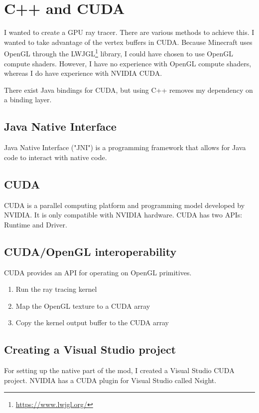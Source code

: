 \documentclass[]{article}
\begin{document}
\section{C++ and CUDA}
I wanted to create a GPU ray tracer.
There are various methods to achieve this. 
I wanted to take advantage of the vertex buffers in CUDA.
Because Minecraft uses OpenGL through the LWJGL\footnote{\url{https://www.lwjgl.org/}} library, I could have chosen to use OpenGL compute shaders.
However, I have no experience with OpenGL compute shaders, whereas I do have experience with NVIDIA CUDA.

There exist Java bindings for CUDA, but using C++ removes my dependency on a binding layer.
\subsection{Java Native Interface}
Java Native Interface ("JNI") is a programming framework that allows for Java code to interact with native code.
\subsection{CUDA}
CUDA is a parallel computing platform and programming model developed by NVIDIA.
It is only compatible with NVIDIA hardware.
CUDA has two APIs: Runtime and Driver.
\subsection{CUDA/OpenGL interoperability}
CUDA provides an API for operating on OpenGL primitives.
\begin{enumerate}
  \item Run the ray tracing kernel
  \item Map the OpenGL texture to a CUDA array
  \item Copy the kernel output buffer to the CUDA array
\end{enumerate}

\subsection{Creating a Visual Studio project}
For setting up the native part of the mod, I created a Visual Studio CUDA project.
NVIDIA has a CUDA plugin for Visual Studio called Nsight.
\end{document}
